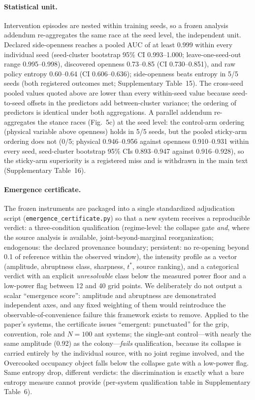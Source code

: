 \documentclass[11pt]{article}
\begin{document}
\paragraph{Statistical unit.}
Intervention episodes are nested within training seeds, so a frozen
analysis addendum re-aggregates the same race at the seed level, the
independent unit. Declared side-openness reaches a pooled AUC of at
least $0.999$ within every individual seed (seed-cluster bootstrap
95\% CI 0.993--1.000; leave-one-seed-out range 0.995--0.998),
discovered openness 0.73--0.85 (CI 0.730--0.851), and raw policy
entropy 0.60--0.64 (CI 0.606--0.636); side-openness beats entropy in
5/5 seeds (both registered outcomes met; Supplementary Table~15).
The cross-seed pooled values quoted above are lower than every
within-seed value because seed-to-seed offsets in the predictors add
between-cluster variance; the ordering of predictors is identical
under both aggregations. A parallel addendum re-aggregates the stance
races (Fig.~5c) at the seed level: the control-arm ordering (physical
variable above openness) holds in 5/5 seeds, but the pooled sticky-arm
ordering does not (0/5; physical 0.946--0.956 against openness
0.910--0.931 within every seed, seed-cluster bootstrap 95\% CIs
0.893--0.947 against 0.916--0.928), so the sticky-arm superiority is a
registered miss and is withdrawn in the main text (Supplementary
Table~16).

\paragraph{Emergence certificate.}
The frozen instruments are packaged into a single standardized
adjudication script (\texttt{emergence\_\allowbreak certificate.py})
so that a new system
receives a reproducible verdict: a three-condition qualification
(regime-level: the collapse gate \emph{and}, where the source analysis
is available, joint-beyond-marginal reorganization; endogenous: the
declared provenance boundary; persistent: no re-opening beyond 0.1 of
reference within the observed window), the intensity profile as a
vector (amplitude, abruptness class, sharpness, $t^{*}$, source
ranking), and a categorical verdict with an explicit
\emph{unresolvable} class below the measured power floor and a
low-power flag between 12 and 40 grid points. We deliberately do not
output a scalar ``emergence score'': amplitude and abruptness are
demonstrated independent axes, and any fixed weighting of them would
reintroduce the observable-of-convenience failure this framework
exists to remove. Applied to the paper's systems, the certificate
issues ``emergent: punctuated'' for the grip, convention, role and
$N{=}100$ ant systems; the single-ant control---with nearly the same
amplitude (0.92) as the colony---\emph{fails} qualification,
because its collapse is carried entirely by the individual source,
with no joint regime involved,
and the Overcooked occupancy object falls below the collapse
gate with a low-power flag. Same entropy drop, different verdicts: the
discrimination is exactly what a bare entropy measure cannot provide
(per-system qualification table in Supplementary Table~6).
\end{document}
